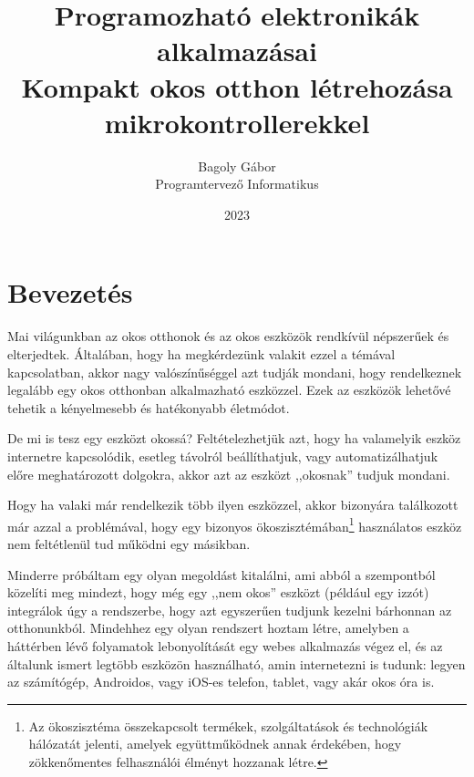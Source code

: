 \documentclass[
]{thesis-ekf}
\theoremstyle{definition}
\theoremstyle{remark}
\begin{document}
	\title{Programozható elektronikák alkalmazásai\\
	\large{Kompakt okos otthon létrehozása mikrokontrollerekkel}}
	\author{Bagoly Gábor\\Programtervező Informatikus}
	\date{2023}
	\maketitle
	\tableofcontents
	
	\chapter*{Bevezetés}
	
	Mai világunkban az okos otthonok és az okos eszközök rendkívül népszerűek és elterjedtek. Általában, hogy ha megkérdezünk valakit ezzel a témával kapcsolatban, akkor nagy valószínűséggel azt tudják mondani, hogy rendelkeznek legalább egy okos otthonban alkalmazható eszközzel. Ezek az eszközök lehetővé tehetik a kényelmesebb és hatékonyabb életmódot. 
	
	De mi is tesz egy eszközt okossá? Feltételezhetjük azt, hogy ha valamelyik eszköz internetre kapcsolódik, esetleg távolról beállíthatjuk, vagy automatizálhatjuk előre meghatározott dolgokra, akkor azt az eszközt ,,okosnak'' tudjuk mondani.
	
	Hogy ha valaki már rendelkezik több ilyen eszközzel, akkor bizonyára találkozott már azzal a problémával, hogy egy bizonyos ökoszisztémában\footnote{Az ökoszisztéma összekapcsolt termékek, szolgáltatások és technológiák hálózatát jelenti, amelyek együttműködnek annak érdekében, hogy zökkenőmentes felhasználói élményt hozzanak létre.} használatos eszköz nem feltétlenül tud működni egy másikban. 
	
	Minderre próbáltam egy olyan megoldást kitalálni, ami abból a szempontból közelíti meg mindezt, hogy még egy ,,nem okos'' eszközt (például egy izzót) integrálok úgy a rendszerbe, hogy azt egyszerűen tudjunk kezelni bárhonnan az otthonunkból. Mindehhez egy olyan rendszert hoztam létre, amelyben a háttérben lévő folyamatok lebonyolítását egy webes alkalmazás végez el, és az általunk ismert legtöbb eszközön használható, amin internetezni is tudunk: legyen az számítógép, Androidos, vagy iOS-es telefon, tablet, vagy akár okos óra is.
	
\end{document}

